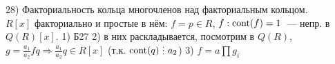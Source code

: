 28) Факториальность кольца многочленов над факториальным кольцом.\\
$R[x]$ факториально и простые в нём: $f = p \in R$, $f: \operatorname{cont}(f) = 1$~--- непр. в $Q(R)[x]$. 1) Б27 2) в них раскладывается, посмотрим в $Q(R)$, $g=\frac{a_1}{a_2}fq \Rightarrow \frac{a_1}{a_2}q \in R[x]$ (т.к. $\cnt(q)\di a_2$) 3) $f=a\prod g_i$\\
